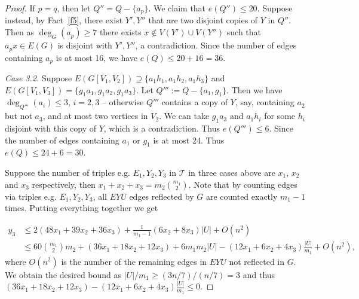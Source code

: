 \documentclass[11pt, reqno]{amsart}    	%
\theoremstyle{definition}
\def\cT{\mathcal T}
\numberwithin{equation}{section}
\begin{document}
\begin{proof}
		If $p=q$, then let $ Q''= Q-\{a_p\} $. We claim that $e(Q'')\le20$. Suppose  instead, by Fact~\ref{f5}, there  exist  $Y',Y''$ that are two disjoint copies of $Y$ in $ Q'' $. 
		Then as $\deg_G(a_p)\ge 7$ there exists $x \notin V(Y')\cup V(Y'')$ such that $a_px\in E(G)$ is disjoint with $Y',Y''$, a contradiction.
		Since the number of edges containing $ a_p$ is at most 16, we have $e(Q)\le 20+16=36.$
		
		\medskip
		\noindent\emph{Case 3.2.}
		Suppose $ E(G[V_{1},V_{2}])\supseteq \{a_1h_1,a_1h_2,a_1h_3\}$ and $E(G[V_{1},V_{3}])=\{g_1a_1,g_1a_2,g_1a_3\}$. 
		Let $ Q''':=Q-\{a_1,g_1\} $. Then we have $\deg_{Q'''}(a_i)\le 3$, $i=2,3$ -- otherwise $Q'''$ contains a copy of $Y$, say, containing $a_2$ but not $a_3$, and at most two vertices in $V_2$.
		We can take $g_1a_3$ and $a_1h_i$ for some $h_i$ disjoint with this copy of $Y$, which is a contradiction.
		Thus $e(Q''')\le 6$. 
		Since the number of edges containing $ a_1$ or $g_1$ is at most 24. Thus $e(Q)\le 24+6=30.$
		
		
		\medskip	
		Suppose the number of triples e.g. $E_1, Y_2, Y_3$ in $\cT$ in three cases above are $x_1$, $x_2$ and $x_3$ respectively, then $x_1+x_2+x_3=m_2\binom{m_1}{2}$. 	Note that by counting edges via triples e.g. $E_1,Y_2, Y_3$, all $EYU$ edges reflected by $G$ are counted exactly $m_1-1$ times. Putting everything together we get 
		
		\[\begin{split}
			y_{3}&\le 	2 (48x_1+39x_2+36x_3)+\frac{1}{m_1-1}(6x_2+8x_3)|U|+O(n^2) \\
			&\le 60\binom{m_1}{2}m_2 + (36x_1+18x_2+12x_3) + 6m_1m_2|U| - (12x_1+6x_2+4x_3)\frac{|U|}{m_1}+O(n^2),
		\end{split}\]
		where $ O(n^2) $ is the number of the remaining edges in  $ EYU $ not reflected in $G$.
		We obtain the desired bound as $|U|/m_1\ge (3n/7)/(n/7)=3$ and thus $(36x_1+18x_2+12x_3) - (12x_1+6x_2+4x_3)\frac{|U|}{m_1}\le 0$.
	\end{proof}	
	
\end{document}
